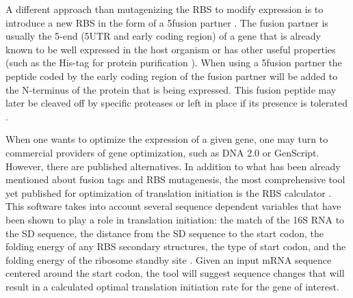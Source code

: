 A different approach than mutagenizing the RBS to modify expression is to introduce
a new RBS in the form of a 5\ppp fusion partner \cite{lavallie_gene_1995}. The
fusion partner is usually the 5\ppp-end (5\ppp UTR and early coding region) of
a gene that is already known to be well expressed in the host organism or has
other useful properties (such as the His-tag for protein purification
\cite{cebe_rapid_2006}). When using a 5\ppp fusion partner the peptide coded by
the early coding region of the fusion partner will be added to the N-terminus
of the protein that is being expressed. This fusion peptide may later be
cleaved off by specific proteases or left in place if its presence is tolerated
\cite{esposito_enhancement_2006}.

When one wants to optimize the expression of a given gene, one may turn to
commercial providers of gene optimization, such as DNA 2.0 or GenScript.
However, there are published alternatives. In addition to what has been already
mentioned about fusion tags and RBS mutagenesis, the most comprehensive tool
yet published for optimization of translation initiation is the RBS calculator
\cite{salis_automated_2009}. This software takes into account several sequence
dependent variables that have been shown to play a role in translation
initiation: the match of the 16S RNA to the SD sequence, the distance from the
SD sequence to the start codon, the folding energy of any RBS secondary
structures, the type of start codon, and the folding energy of the ribosome
standby site \cite{salis_automated_2009}. Given an input mRNA sequence centered
around the start codon, the tool will suggest sequence changes that will result
in a calculated optimal translation initiation rate for the gene of interest.


